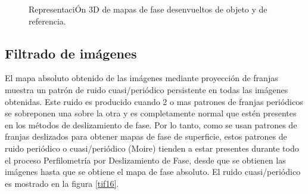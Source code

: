 \documentclass[10pt,letterpaper]{article}
\begin{document}
\begin{figure}[H]
      \begin{center}
        \caption{RepresentaciÓn 3D de mapas de fase desenvueltos de objeto y de referencia.}
        \label{tif1415}
      \end{center}
    \end{figure}

\subsection{Filtrado de imágenes}
El mapa absoluto obtenido de las imágenes mediante proyección de franjas muestra un patrón de ruido cuasi/periódico persistente en todas las imágenes obtenidas. Este ruido es producido cuando 2 o mas patrones de franjas periódicos se sobreponen una sobre la otra y es completamente normal que estén presentes en los métodos de deslizamiento de fase. Por lo tanto, como se usan patrones de franjas deslizados para obtener mapas de fase de superficie, estos patrones de ruido periódico o cuasi/periódico (Moire) tienden a estar presentes durante todo el proceso Perfilometría por Deslizamiento de Fase, desde que se obtienen las imágenes hasta que se obtiene el mapa de fase absoluto. El ruido cuasi/periódico es mostrado en la figura \ref{tif16}.
\end{document}
